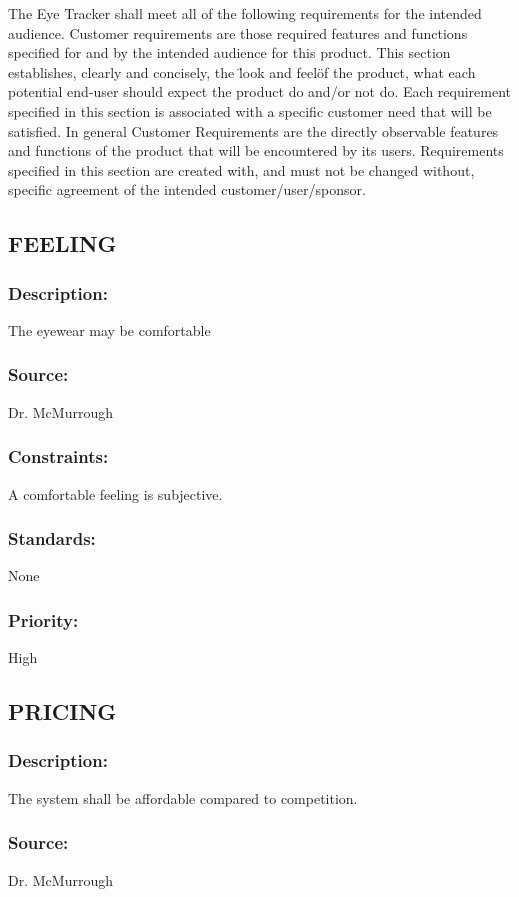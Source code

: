 The Eye Tracker shall meet all of the following requirements for the intended audience. Customer requirements are those required features and functions specified for and by the intended audience for this product. This section establishes, clearly and concisely, the \"look and feel\" of the product, what each potential end-user should expect the product do and/or not do. Each requirement specified in this section is associated with a specific customer need that will be satisfied. In general Customer Requirements are the directly observable features and functions of the product that will be encountered by its users. Requirements specified in this section are created with, and must not be changed without, specific agreement of the intended customer/user/sponsor.

\subsection{\text FEELING}
\subsubsection{Description:}
	{The eyewear may be comfortable}
\subsubsection{Source: }
	{Dr. McMurrough}
\subsubsection{Constraints:}
	{A comfortable feeling is subjective.}
\subsubsection{Standards:}
	{None}
\subsubsection{Priority:}
	{High}
\newline
	
\subsection{\text PRICING}
\subsubsection{Description:} 
	{The system shall be affordable compared to competition.}
\subsubsection{Source:} 
	{Dr. McMurrough}
